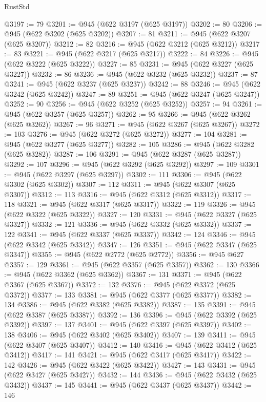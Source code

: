 \begin{lexlean}{RustStd}
\begin{coremodule}
@3197 := 79
@3201 := @945 (@622 @3197 (@625 @3197))
@3202 := 80
@3206 := @945 (@622 @3202 (@625 @3202))
@3207 := 81
@3211 := @945 (@622 @3207 (@625 @3207))
@3212 := 82
@3216 := @945 (@622 @3212 (@625 @3212))
@3217 := 83
@3221 := @945 (@622 @3217 (@625 @3217))
@3222 := 84
@3226 := @945 (@622 @3222 (@625 @3222))
@3227 := 85
@3231 := @945 (@622 @3227 (@625 @3227))
@3232 := 86
@3236 := @945 (@622 @3232 (@625 @3232))
@3237 := 87
@3241 := @945 (@622 @3237 (@625 @3237))
@3242 := 88
@3246 := @945 (@622 @3242 (@625 @3242))
@3247 := 89
@3251 := @945 (@622 @3247 (@625 @3247))
@3252 := 90
@3256 := @945 (@622 @3252 (@625 @3252))
@3257 := 94
@3261 := @945 (@622 @3257 (@625 @3257))
@3262 := 95
@3266 := @945 (@622 @3262 (@625 @3262))
@3267 := 96
@3271 := @945 (@622 @3267 (@625 @3267))
@3272 := 103
@3276 := @945 (@622 @3272 (@625 @3272))
@3277 := 104
@3281 := @945 (@622 @3277 (@625 @3277))
@3282 := 105
@3286 := @945 (@622 @3282 (@625 @3282))
@3287 := 106
@3291 := @945 (@622 @3287 (@625 @3287))
@3292 := 107
@3296 := @945 (@622 @3292 (@625 @3292))
@3297 := 109
@3301 := @945 (@622 @3297 (@625 @3297))
@3302 := 111
@3306 := @945 (@622 @3302 (@625 @3302))
@3307 := 112
@3311 := @945 (@622 @3307 (@625 @3307))
@3312 := 113
@3316 := @945 (@622 @3312 (@625 @3312))
@3317 := 118
@3321 := @945 (@622 @3317 (@625 @3317))
@3322 := 119
@3326 := @945 (@622 @3322 (@625 @3322))
@3327 := 120
@3331 := @945 (@622 @3327 (@625 @3327))
@3332 := 121
@3336 := @945 (@622 @3332 (@625 @3332))
@3337 := 122
@3341 := @945 (@622 @3337 (@625 @3337))
@3342 := 124
@3346 := @945 (@622 @3342 (@625 @3342))
@3347 := 126
@3351 := @945 (@622 @3347 (@625 @3347))
@3355 := @945 (@622 @2772 (@625 @2772))
@3356 := @945 @627
@3357 := 129
@3361 := @945 (@622 @3357 (@625 @3357))
@3362 := 130
@3366 := @945 (@622 @3362 (@625 @3362))
@3367 := 131
@3371 := @945 (@622 @3367 (@625 @3367))
@3372 := 132
@3376 := @945 (@622 @3372 (@625 @3372))
@3377 := 133
@3381 := @945 (@622 @3377 (@625 @3377))
@3382 := 134
@3386 := @945 (@622 @3382 (@625 @3382))
@3387 := 135
@3391 := @945 (@622 @3387 (@625 @3387))
@3392 := 136
@3396 := @945 (@622 @3392 (@625 @3392))
@3397 := 137
@3401 := @945 (@622 @3397 (@625 @3397))
@3402 := 138
@3406 := @945 (@622 @3402 (@625 @3402))
@3407 := 139
@3411 := @945 (@622 @3407 (@625 @3407))
@3412 := 140
@3416 := @945 (@622 @3412 (@625 @3412))
@3417 := 141
@3421 := @945 (@622 @3417 (@625 @3417))
@3422 := 142
@3426 := @945 (@622 @3422 (@625 @3422))
@3427 := 143
@3431 := @945 (@622 @3427 (@625 @3427))
@3432 := 144
@3436 := @945 (@622 @3432 (@625 @3432))
@3437 := 145
@3441 := @945 (@622 @3437 (@625 @3437))
@3442 := 146

\end{coremodule}
\end{lexlean}
